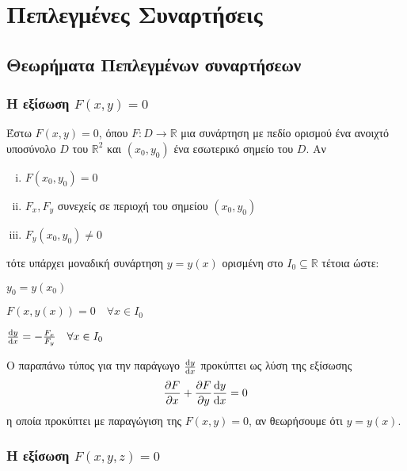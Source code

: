 


\everymath{\displaystyle}




\chapter{Πεπλεγμένες Συναρτήσεις}


\section{Θεωρήματα Πεπλεγμένων συναρτήσεων}

\vspace{\baselineskip}

\subsection{Η εξίσωση \ensuremath{F(x,y) = 0}}

Έστω $ F(x,y) = 0 $, όπου $ F\colon D \to \mathbb{R} $ μια συνάρτηση με πεδίο
ορισμού ένα ανοιχτό υποσύνολο $D$ του $\mathbb{R}^{2}$ και $ (x_0,y_0) $ ένα 
εσωτερικό σημείο του $D$.  Αν 
\begin{enumerate}[(i)]
    \item $F(x_0,y_0) = 0$ 
    \item $ F_x, F_y$ συνεχείς σε περιοχή του σημείου $ (x_0,y_0) $ 
    \item $ F_y(x_0,y_0) \neq 0 $
\end{enumerate}
τότε υπάρχει μοναδική συνάρτηση $ y=y(x) $ ορισμένη στο $ I_0 \subseteq \mathbb{R} $ 
τέτοια ώστε:
\begin{myitemize}
    \item $y_0 = y(x_0)$
    \item $F(x,y(x)) = 0 \quad \forall x \in I_0$
    \item $ \dv{y}{x} = - \frac{F_x}{F_y} \quad \forall x \in I_0  $
\end{myitemize}

\begin{rem}
    Ο παραπάνω τύπος για την παράγωγο $ \dv{y}{x} $ προκύπτει ως λύση της εξίσωσης
    \[
        \pdv{F}{x} + \pdv{F}{y}\dv{y}{x} = 0 
    \] 
    η οποία προκύπτει με παραγώγιση της $ F(x,y) = 0$, αν θεωρήσουμε ότι $ y=y(x) $.
\end{rem}

\subsection{Η εξίσωση \ensuremath{F(x,y,z) = 0}}

